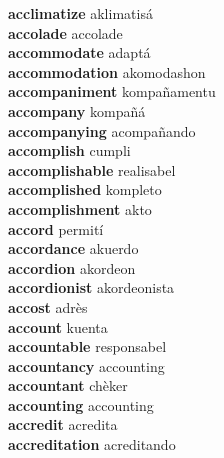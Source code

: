 \textbf{acclimatize } aklimatisá \\
\textbf{accolade } accolade \\
\textbf{accommodate } adaptá \\
\textbf{accommodation } akomodashon \\
\textbf{accompaniment } kompañamentu \\
\textbf{accompany } kompañá \\
\textbf{accompanying } acompañando \\
\textbf{accomplish } cumpli \\
\textbf{accomplishable } realisabel \\
\textbf{accomplished } kompleto \\
\textbf{accomplishment } akto \\
\textbf{accord } permití \\
\textbf{accordance } akuerdo \\
\textbf{accordion } akordeon \\
\textbf{accordionist } akordeonista \\
\textbf{accost } adrès \\
\textbf{account } kuenta \\
\textbf{accountable } responsabel \\
\textbf{accountancy } accounting \\
\textbf{accountant } chèker \\
\textbf{accounting } accounting \\
\textbf{accredit } acredita \\
\textbf{accreditation } acreditando \\
